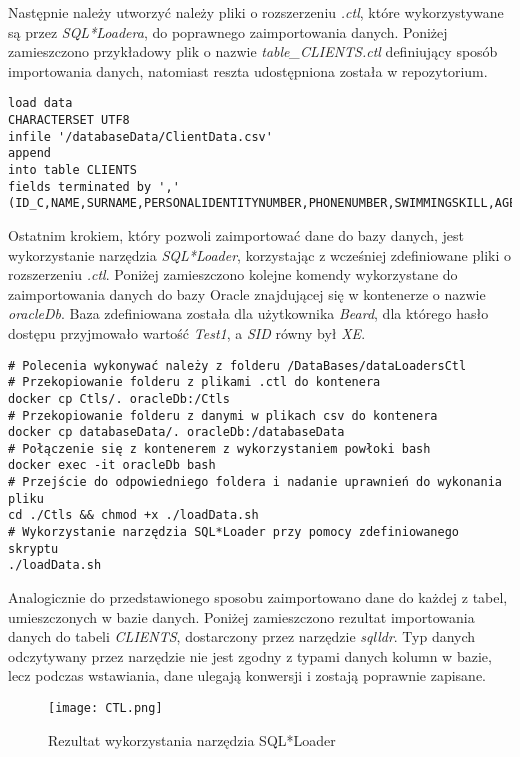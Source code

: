 \documentclass[a4paper]{article}
\begin{document}
Następnie należy utworzyć należy pliki o rozszerzeniu \textit{.ctl}, które wykorzystywane są przez \textit{SQL*Loadera}, \linebreak do poprawnego zaimportowania danych. Poniżej zamieszczono przykładowy plik o nazwie \linebreak \textit{table\_CLIENTS.ctl} definiujący sposób importowania danych, natomiast reszta udostępniona została w repozytorium.

\begin{verbatim}
load data 
CHARACTERSET UTF8
infile '/databaseData/ClientData.csv' 
append
into table CLIENTS
fields terminated by ','
(ID_C,NAME,SURNAME,PERSONALIDENTITYNUMBER,PHONENUMBER,SWIMMINGSKILL,AGE)
\end{verbatim}

Ostatnim krokiem, który pozwoli zaimportować dane do bazy danych, jest wykorzystanie narzędzia \textit{SQL*Loader}, korzystając z wcześniej zdefiniowane pliki o rozszerzeniu \textit{.ctl}. Poniżej zamieszczono kolejne komendy wykorzystane do zaimportowania danych do bazy Oracle znajdującej się w kontenerze o nazwie \textit{oracleDb}. Baza zdefiniowana została dla użytkownika \textit{Beard}, dla którego hasło dostępu przyjmowało wartość \textit{Test1}, a \textit{SID} równy był \textit{XE}.

\begin{verbatim}
# Polecenia wykonywać należy z folderu /DataBases/dataLoadersCtl
# Przekopiowanie folderu z plikami .ctl do kontenera
docker cp Ctls/. oracleDb:/Ctls
# Przekopiowanie folderu z danymi w plikach csv do kontenera
docker cp databaseData/. oracleDb:/databaseData
# Połączenie się z kontenerem z wykorzystaniem powłoki bash
docker exec -it oracleDb bash
# Przejście do odpowiedniego foldera i nadanie uprawnień do wykonania pliku
cd ./Ctls && chmod +x ./loadData.sh
# Wykorzystanie narzędzia SQL*Loader przy pomocy zdefiniowanego skryptu
./loadData.sh
\end{verbatim}

Analogicznie do przedstawionego sposobu zaimportowano dane do każdej z tabel, umieszczonych w bazie danych.
Poniżej zamieszczono rezultat importowania danych do tabeli \textit{CLIENTS}, dostarczony przez narzędzie \textit{sqlldr}. Typ danych odczytywany przez narzędzie nie jest zgodny z typami danych kolumn w bazie, lecz podczas wstawiania, dane ulegają konwersji i zostają poprawnie zapisane.

\newpage

\begin{figure}[h!]
\centering
\texttt{[image: CTL.png]}
\caption{Rezultat wykorzystania narzędzia SQL*Loader}
\end{figure}
\end{document}
